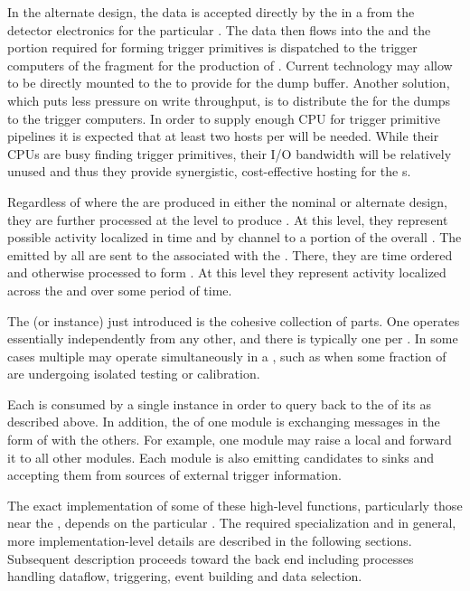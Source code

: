 In the alternate design, the data is accepted directly by the
 in a  from the detector electronics
for the particular .
The data then flows into the  and the portion required
for forming trigger primitives is dispatched to the trigger computers
of the fragment for the production of .
Current  technology may allow  to be directly mounted to the
 to provide for the  dump buffer. 
Another solution, which puts less pressure on write throughput, is to
distribute the  for the  dumps to the trigger computers. 
In order to supply enough CPU for trigger primitive pipelines it is
expected that at least two hosts per  will be needed.
While their CPUs are busy finding trigger primitives, their I/O
bandwidth will be relatively unused and thus they provide synergistic,
cost-effective hosting for the s.

Regardless of where the  are produced in either
the nominal or alternate design, they are further processed at the
 level to produce . 
At this level, they represent possible activity localized in time and
by channel to a portion of the overall .
The  emitted by all  are sent to
the  associated with the .
There, they are time ordered and otherwise processed to form
.
At this level they represent activity localized across the
 and over some period of time.

The  (or  instance) just introduced is the cohesive
collection of  parts. 
One  operates essentially independently from any other,
and there is typically one per . 
In some cases multiple  may operate simultaneously in
a , such as when some fraction of 
are undergoing isolated testing or calibration.

Each  is consumed by a single  instance
in order to query back to the  of its 
as described above.
In addition, the  of one module is exchanging messages in
the form of  with the others. 
For example, one module may raise a local 
 and forward it to all other modules.
Each module is also emitting candidates to sinks and accepting them
from sources of external trigger information.

The exact implementation of some of these high-level functions,
particularly those near the , depends on the particular
. 
The required specialization and in general, more implementation-level
details are described in the following sections.
Subsequent description proceeds toward the  back end including
processes handling dataflow, triggering, event building and data
selection.

